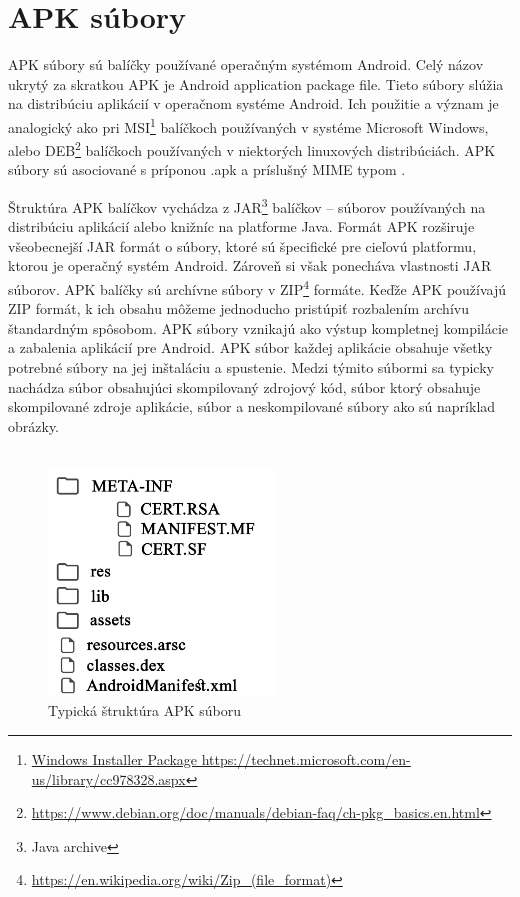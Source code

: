 \chapter{APK súbory}
\label{APKsubory}
APK súbory sú balíčky používané operačným systémom Android. Celý názov ukrytý za skratkou APK je Android application package file. Tieto súbory slúžia na distribúciu aplikácií v operačnom systéme Android. Ich použitie a význam je analogický ako pri MSI\footnote{\url{Windows Installer Package https://technet.microsoft.com/en-us/library/cc978328.aspx}} balíčkoch používaných v systéme Microsoft Windows, alebo DEB\footnote{\url{https://www.debian.org/doc/manuals/debian-faq/ch-pkg\_basics.en.html}} balíčkoch používaných v niektorých linuxových distribúciách. APK súbory sú asociované s príponou .apk a príslušný MIME typom .

Štruktúra APK balíčkov vychádza z JAR\footnote{Java archive} balíčkov -- súborov používaných na distribúciu aplikácií alebo knižníc na platforme Java. Formát APK rozširuje všeobecnejší JAR formát o súbory, ktoré sú špecifické pre cieľovú platformu, ktorou je operačný systém Android. Zároveň si však ponecháva vlastnosti JAR súborov. APK balíčky sú archívne súbory v ZIP\footnote{\url{https://en.wikipedia.org/wiki/Zip\_(file_format)}} formáte.  Keďže APK používajú ZIP formát, k ich obsahu môžeme jednoducho pristúpiť rozbalením archívu štandardným spôsobom.  APK súbory vznikajú ako výstup kompletnej kompilácie a zabalenia aplikácií pre Android. APK súbor každej aplikácie obsahuje všetky potrebné súbory na jej inštaláciu a spustenie. Medzi týmito súbormi sa typicky nachádza  súbor obsahujúci skompilovaný zdrojový kód,  súbor ktorý obsahuje skompilované zdroje aplikácie, súbor  a neskompilované súbory ako sú napríklad obrázky.\\\\
\begin{figure}[htb]
  \begin{center}
    \includegraphics[width=60mm]{images/apkStructure.pdf}
  \end{center}
  \caption{Typická štruktúra APK súboru}
\end{figure}

